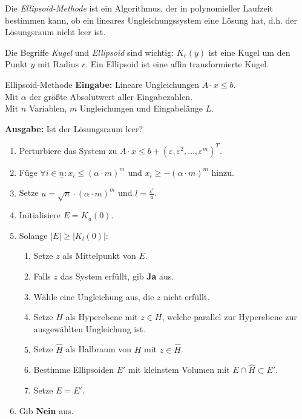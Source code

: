 \documentclass{panikzettel}
\begin{document}
Die \emph{Ellipsoid-Methode} ist ein Algorithmus, der in polynomieller Laufzeit bestimmen kann, ob ein lineares Ungleichungssystem eine Lösung hat, d.h. der Lösungsraum nicht leer ist.

Die Begriffe \emph{Kugel} und \emph{Ellipsoid} sind wichtig:
$K_r(y)$ ist eine Kugel um den Punkt $y$ mit Radius $r$. Ein Ellipsoid ist eine affin transformierte Kugel.

\begin{algo}{Ellipsoid-Methode}
\textbf{Eingabe:} Lineare Ungleichungen $A \cdot x \leq b$.\\
Mit $\alpha$ der größte Absolutwert aller Eingabezahlen. \\
Mit $n$ Variablen, $m$ Ungleichungen und Eingabelänge $L$.

\textbf{Ausgabe:} Ist der Lösungsraum leer?
\tcblower

\begin{enumerate}
    \item Perturbiere das System zu $A \cdot x \leq b + (\varepsilon, \varepsilon^2, \dots ,\varepsilon^m)^T$.
    \item Füge $\forall i \in \underline{n} : x_i \leq (\alpha \cdot m)^m$ und $x_i\geq -(\alpha \cdot m)^m$ hinzu.
    \item Setze $u = \sqrt{n} \cdot (\alpha \cdot m)^m$ und $l = \frac{\varepsilon^i}{u}$.
    \item Initialisiere $E = K_u(0)$.
    \item Solange $|E| \geq |K_l(0)|$:
    \begin{enumerate}
        \item Setze $z$ als Mittelpunkt von $E$.
        \item Falls $z$ das System erfüllt, gib \textbf{Ja} aus.
        \item Wähle eine Ungleichung aus, die $z$ nicht erfüllt.
        \item Setze $H$ als Hyperebene mit $z \in H$, welche parallel zur Hyperebene zur ausgewählten Ungleichung ist.
        \item Setze $\hat{H}$ als Halbraum von $H$ mit $z \in \hat{H}$.
        \item Bestimme Ellipsoiden $E'$ mit kleinstem Volumen mit $E \cap \hat{H} \subset E'$.
        \item Setze $E = E'$.
    \end{enumerate}
    \item Gib \textbf{Nein} aus.
\end{enumerate}
\end{algo}
\end{document}
